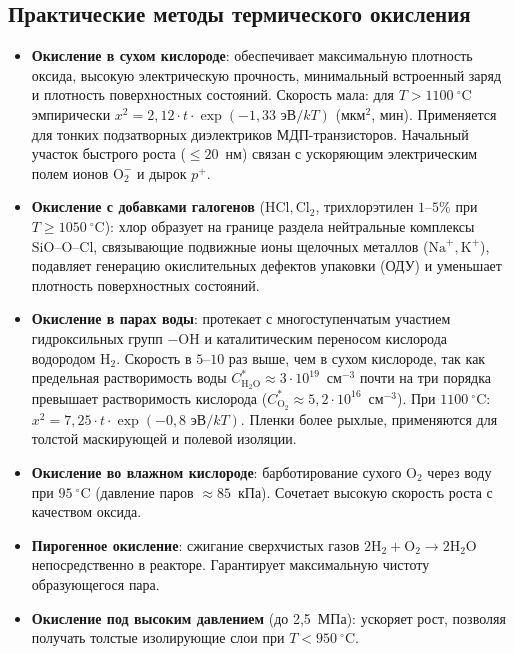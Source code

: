 \documentclass[12pt,a4paper]{article}
\theoremstyle{plain}
\theoremstyle{definition}
\theoremstyle{remark}
\numberwithin{equation}{section}
\begin{document}
\subsection{Практические методы термического окисления}

\begin{itemize}
    \item \textbf{Окисление в сухом кислороде}: обеспечивает максимальную плотность оксида, высокую электрическую прочность, минимальный встроенный заряд и плотность поверхностных состояний. Скорость мала: для $T > 1100~^\circ\mathrm{C}$ эмпирически $x^2 = 2{,}12 \cdot t \cdot \exp(-1{,}33\text{ эВ}/kT)$ (мкм$^2$, мин). Применяется для тонких подзатворных диэлектриков МДП-транзисторов. Начальный участок быстрого роста ($\le 20$~нм) связан с ускоряющим электрическим полем ионов $\mathrm{O}_2^-$ и дырок $p^+$.
    \item \textbf{Окисление с добавками галогенов} ($\mathrm{HCl}, \mathrm{Cl}_2$, трихлорэтилен $1\text{--}5\%$ при $T \ge 1050~^\circ\mathrm{C}$): хлор образует на границе раздела нейтральные комплексы $\mathrm{SiO\text{--}O\text{--}Cl}$, связывающие подвижные ионы щелочных металлов ($\mathrm{Na}^+, \mathrm{K}^+$), подавляет генерацию окислительных дефектов упаковки (ОДУ) и уменьшает плотность поверхностных состояний.
    \item \textbf{Окисление в парах воды}: протекает с многоступенчатым участием гидроксильных групп $-\mathrm{OH}$ и каталитическим переносом кислорода водородом $\mathrm{H}_2$. Скорость в $5\text{--}10$ раз выше, чем в сухом кислороде, так как предельная растворимость воды $C^*_{\mathrm{H}_2\mathrm{O}} \approx 3 \cdot 10^{19}$~см$^{-3}$ почти на три порядка превышает растворимость кислорода ($C^*_{\mathrm{O}_2} \approx 5{,}2 \cdot 10^{16}$~см$^{-3}$). При $1100~^\circ\mathrm{C}$: $x^2 = 7{,}25 \cdot t \cdot \exp(-0{,}8\text{ эВ}/kT)$. Пленки более рыхлые, применяются для толстой маскирующей и полевой изоляции.
    \item \textbf{Окисление во влажном кислороде}: барботирование сухого $\mathrm{O}_2$ через воду при $95~^\circ\mathrm{C}$ (давление паров $\approx 85$~кПа). Сочетает высокую скорость роста с качеством оксида.
    \item \textbf{Пирогенное окисление}: сжигание сверхчистых газов $2\mathrm{H}_2 + \mathrm{O}_2 \to 2\mathrm{H}_2\mathrm{O}$ непосредственно в реакторе. Гарантирует максимальную чистоту образующегося пара.
    \item \textbf{Окисление под высоким давлением} (до 2,5~МПа): ускоряет рост, позволяя получать толстые изолирующие слои при $T < 950~^\circ\mathrm{C}$.
\end{itemize}
\end{document}
